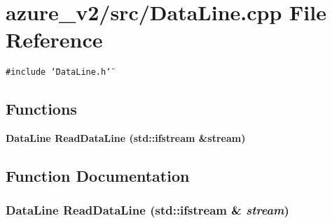 \section{azure\_\-v2/src/Data\-Line.cpp File Reference}
\label{DataLine_8cpp}
{\tt \#include \char`\"{}Data\-Line.h\char`\"{}}\par
\subsection*{Functions}
\begin{CompactItemize}
\item 
\bf{Data\-Line} \bf{Read\-Data\-Line} (std::ifstream \&stream)
\end{CompactItemize}


\subsection{Function Documentation}
\subsubsection{\setlength{\rightskip}{0pt plus 5cm}\bf{Data\-Line} Read\-Data\-Line (std::ifstream \& {\em stream})}\label{DataLine_8cpp_26dd28767854336a9d45ae7dea6a58db}


